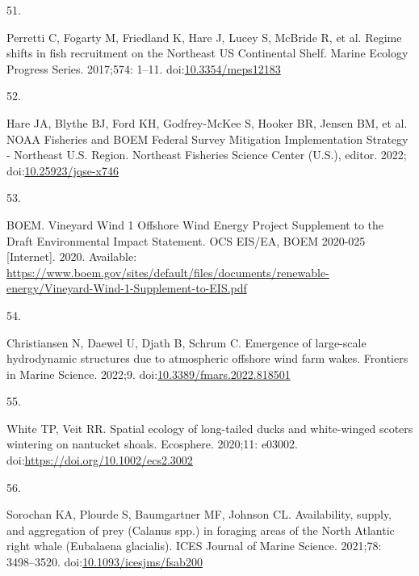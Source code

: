 \documentclass[
  10pt,
]{article}
\newlength{\cslhangindent}
\newlength{\csllabelwidth}
\newlength{\cslentryspacingunit} %
\newenvironment{CSLReferences}[2] %
 {%
  \setlength{\parindent}{0pt}
  \ifodd #1
  \let\oldpar\par
  \def\par{\hangindent=\cslhangindent\oldpar}
  \fi
  \setlength{\parskip}{#2\cslentryspacingunit}
 }%
 {}
\newcommand{\CSLLeftMargin}[1]{\parbox[t]{\csllabelwidth}{#1}}
\newcommand{\CSLRightInline}[1]{\parbox[t]{\linewidth - \csllabelwidth}{#1}\break}
\begin{document}
\begin{CSLReferences}{0}{0}
\leavevmode{}%
\CSLLeftMargin{51. }%
\CSLRightInline{Perretti C, Fogarty M, Friedland K, Hare J, Lucey S, McBride R, et al. Regime shifts in fish recruitment on the {Northeast} {US} {Continental} {Shelf}. Marine Ecology Progress Series. 2017;574: 1--11. doi:\href{https://doi.org/10.3354/meps12183}{10.3354/meps12183}}

\leavevmode{}%
\CSLLeftMargin{52. }%
\CSLRightInline{Hare JA, Blythe BJ, Ford KH, Godfrey-McKee S, Hooker BR, Jensen BM, et al. {NOAA} {Fisheries} and {BOEM} {Federal} {Survey} {Mitigation} {Implementation} {Strategy} - {Northeast} {U}.{S}. {Region}. Northeast Fisheries Science Center (U.S.), editor. 2022; doi:\href{https://doi.org/10.25923/jqse-x746}{10.25923/jqse-x746}}

\leavevmode{}%
\CSLLeftMargin{53. }%
\CSLRightInline{BOEM. Vineyard {Wind} 1 {Offshore} {Wind} {Energy} {Project} {Supplement} to the {Draft} {Environmental} {Impact} {Statement}. {OCS} {EIS}/{EA}, {BOEM} 2020-025 {[}Internet{]}. 2020. Available: \url{https://www.boem.gov/sites/default/files/documents/renewable-energy/Vineyard-Wind-1-Supplement-to-EIS.pdf}}

\leavevmode{}%
\CSLLeftMargin{54. }%
\CSLRightInline{Christiansen N, Daewel U, Djath B, Schrum C. Emergence of large-scale hydrodynamic structures due to atmospheric offshore wind farm wakes. Frontiers in Marine Science. 2022;9. doi:\href{https://doi.org/10.3389/fmars.2022.818501}{10.3389/fmars.2022.818501}}

\leavevmode{}%
\CSLLeftMargin{55. }%
\CSLRightInline{White TP, Veit RR. Spatial ecology of long-tailed ducks and white-winged scoters wintering on nantucket shoals. Ecosphere. 2020;11: e03002. doi:\url{https://doi.org/10.1002/ecs2.3002}}

\leavevmode{}%
\CSLLeftMargin{56. }%
\CSLRightInline{Sorochan KA, Plourde S, Baumgartner MF, Johnson CL. {Availability, supply, and aggregation of prey (Calanus spp.) in foraging areas of the North Atlantic right whale (Eubalaena glacialis)}. ICES Journal of Marine Science. 2021;78: 3498--3520. doi:\href{https://doi.org/10.1093/icesjms/fsab200}{10.1093/icesjms/fsab200}}

\end{CSLReferences}
\end{document}
